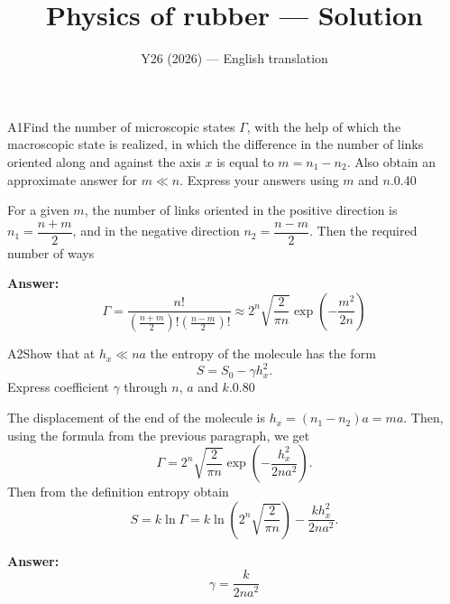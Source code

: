 \documentclass[11pt,a4paper]{article}
\title{\textbf{Physics of rubber --- Solution}}
\author{\normalsize Y26 (2026) — English translation}
\date{}
\begin{document}
\maketitle\vspace{-0.5em}
\begin{solcard}{A1}{Find the number of microscopic states $\Gamma$, with the help of which the macroscopic state is realized, in which the difference in the number of links oriented along and against the axis $x$ is equal to $m = n_1 - n_2$. Also obtain an approximate answer for $m \ll n$. Express your answers using $m$ and $n$.}{0.40}

For a given $m$, the number of links oriented in the positive direction is $n_1 = \dfrac{n+m}{2}$, and in the negative direction $n_2 = \dfrac{n-m}{2}$. Then the required number of ways

\par\smallskip\noindent\textbf{Answer:} $$ \Gamma = \frac{n!}{\left(\frac{n+m}{2}\right)! \left(\frac{n-m}{2}\right)!} \approx 2^n \sqrt{\frac{2}{\pi n}} \exp\left( - \frac{m^2}{2n}\right) $$
\end{solcard}

\begin{solcard}{A2}{Show that at $ h_x \ll n a$ the entropy of the molecule has the form $$ S = S_0 - \gamma h_x^2. $$Express coefficient $\gamma$ through $n$, $a$ and $k$.}{0.80}

The displacement of the end of the molecule is $h_x = (n_1 - n_2) a = ma$. Then, using the formula from the previous paragraph, we get $$ \Gamma = 2^n \sqrt{\frac{2}{\pi n}} \exp\left( - \frac{h_x^2}{2n a^2}\right). $$Then from the definition entropy obtain $$ S = k \ln \Gamma = k \ln\left( 2^n \sqrt{\frac{2}{\pi n}} \right) - \frac{k h_x^2}{2 n a^2}. $$

\par\smallskip\noindent\textbf{Answer:} $$ \gamma = \frac{k}{2 na^2} $$
\end{solcard}
\end{document}
